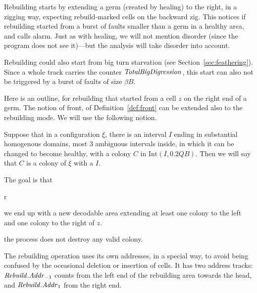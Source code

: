 \documentclass[11pt]{memoir}
\theoremstyle{definition} %
\newcommand{\fld}[1]{\ensuremath{\textit{#1\/}}}
\def\B{B}
\newcommand{\Int}{\mathrm{Int}} %
\newcommand{\Q}{Q} %
\newcommand{\z}{z} %
\newcommand{\Addr}{\fld{Addr}}
\newcommand{\Rebuild}{\fld{Rebuild}} %
\newcommand{\totalBigDigression}{\fld{TotalBigDigression}}
\begin{document}
Rebuilding starts by extending a germ (created by healing) to the right, in a zigging way,
expecting rebuild-marked cells on the backward zig.
This notices if rebuilding started from a burst of faults smaller than a germ
in a healthy area, and calls alarm.
Just as with healing, we will not mention disorder (since the program does not see it)---but
the analysis will take disorder into account.

Rebuilding could also start from big turn starvation (see Section~\ref{sec:feathering}).
Since a whole track carries the counter \( \totalBigDigression \),
this start can also not be triggered by a burst of faults of size \( \beta\B \).

Here is an outline, for rebuilding that started from a cell \( \z \) on the right end of a germ.
The notion of front, of Definition~\ref{def:front} can be extended also to the rebuilding mode.
We will use the following notion.

\begin{definition}\label{def:valid-colony}
  Suppose that in a configuration \( \xi \), there is an interval \( I \) 
  ending in substantial homogenous domains,
  most 3 ambiguous intervals inside, in which it can be changed
  to become healthy, with a colony \( C \) in \( \Int(I,0.2\Q\B) \).
  Then we will say that \( C \) is a  colony of \( \xi \) with a  \( I \).
\end{definition}

The goal is that
\begin{varenum}{r}
\item\label{i:rebuild-size} we end up with a new decodable area
  extending at least one colony to the left and one colony to the right of \( \z \).
\item\label{i:keep-healthy} the process does not destroy any valid colony.
\end{varenum}

The rebuilding operation uses its own addresses, in a special way, to avoid being
confused by the occasional deletion or insertion of cells.
It has two address tracks: 
\( \Rebuild.\Addr_{-1} \) counts from the left end of the rebuilding area towards the head,
and \( \Rebuild.\Addr_{1} \) from the right end.

\end{document}
